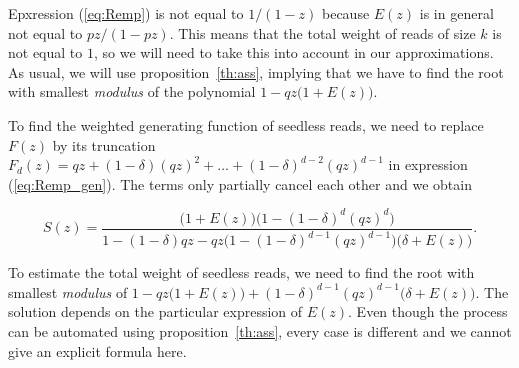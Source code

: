 \documentclass{article}
\begin{document}
Epxression (\ref{eq:Remp}) is not equal to $1/(1-z)$ because $E(z)$ is in
general not equal to $pz/(1-pz)$. This means that the total weight of
reads of size $k$ is not equal to $1$, so we will need to take this
into account in our approximations. As usual, we will use
proposition~\ref{th:ass}, implying that we have to find the root with
smallest \textit{modulus} of the polynomial $1-qz\big(1+E(z)\big)$.

To find the weighted generating function of seedless reads, we need to
replace $F(z)$ by its truncation $F_d(z) = qz + (1-\delta)(qz)^2 + \ldots
+ (1-\delta)^{d-2}(qz)^{d-1}$ in expression (\ref{eq:Remp_gen}). The terms
only partially cancel each other and we obtain

\begin{equation}
\label{eq:Semp}
S(z) = \frac{\big(1+E(z)\big)\big( 1-(1-\delta)^d(qz)^d \big)}
{1-(1-\delta)qz-qz\big(1-(1-\delta)^{d-1}(qz)^{d-1}\big)
\big(\delta+E(z)\big) }.
\end{equation}

To estimate the total weight of seedless reads, we need to find the root
with smallest \textit{modulus} of $1-qz\big(1+E(z)\big) +
(1-\delta)^{d-1}(qz)^{d-1}\big(\delta+E(z)\big)$. The solution depends on
the particular expression of $E(z)$. Even though the process can be
automated using proposition~\ref{th:ass}, every case is different and
we cannot give an explicit formula here.
\end{document}

